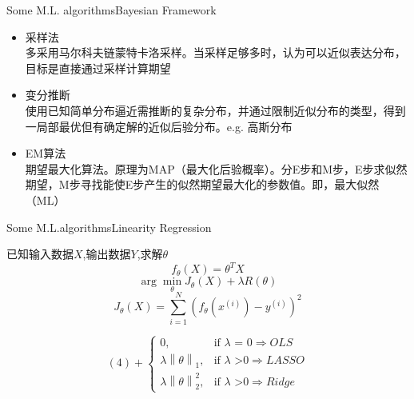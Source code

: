 \documentclass{beamer}
\begin{document}
\begin{frame}{Some M.L. algorithms}{\quad \quad \quad Bayesian Framework}

   \begin{itemize}
  \item 采样法\\多采用马尔科夫链蒙特卡洛采样。当采样足够多时，认为可以近似表达分布，目标是直接通过采样计算期望
  \item 变分推断\\使用已知简单分布逼近需推断的复杂分布，并通过限制近似分布的类型，得到一局部最优但有确定解的近似后验分布。e.g. 高斯分布
  \item EM算法\\期望最大化算法。原理为MAP（最大化后验概率）。分E步和M步，E步求似然期望，M步寻找能使E步产生的似然期望最大化的参数值。即，最大似然（ML）
  \end{itemize}
\end{frame}

\begin{frame}{Some M.L.algorithms}{\quad \quad \quad Linearity Regression}

\begin{block}{}
已知输入数据$X$,输出数据$Y$,求解$\theta$
\begin{equation}
f_{\theta}(X)={\theta}^TX
\end{equation}
\begin{equation}
\arg\min\limits_{\theta} J_{\theta}(X)+\lambda R(\theta) 
\end{equation}
\begin{equation}
J_\theta(X)=\sum_{i=1}^N (f_{\theta}(x^{(i)})-y^{(i)})^2
\end{equation}

\begin{equation*}
(4) +
\begin{cases} 
0,  & \mbox{if }\lambda \mbox{ = 0}\Rightarrow OLS \\
\lambda \left \| \theta \right \|_1, & \mbox{if } \lambda \mbox{ >0}\Rightarrow LASSO \\
\lambda \left \| \theta \right \|_2^2, & \mbox{if } \lambda \mbox{ >0} \Rightarrow Ridge
\end{cases}
\end{equation*}

\end{block}

\end{frame}
\end{document}
